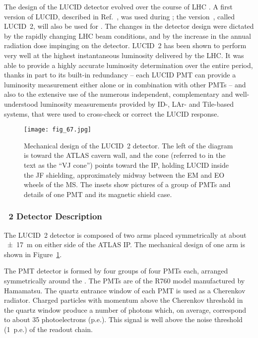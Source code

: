 \documentclass[cernpreprint, atlasdraft=false, UKenglish,british,orcidlogo, texmf, orcidlogo]{atlasdoc}
\begin{document}
The design of the \gls{LUCID} detector evolved over the course of \gls{LHC} \RunOneTwo. A first version of \gls{LUCID}, described in Ref.~\cite{PERF-2007-01}, was used during \RunOne; the \RunTwo version~\cite{lucid2-pmt,lucid2}, called \gls{LUCID}~2, will also be used for \RunThr. The changes in the detector design were dictated by the rapidly changing \gls{LHC} beam conditions, and by the increase in the annual radiation dose impinging on the detector. \gls{LUCID}~2 has been shown to perform very well at the highest instantaneous luminosity delivered by the \gls{LHC}. It was able to provide a highly accurate luminosity determination over the entire \RunTwo period, thanks in part to its built-in redundancy -- each \gls{LUCID} \gls{PMT} can provide a luminosity measurement either alone or in combination with other \glspl{PMT} -- and also to the extensive use of the numerous independent, complementary and well-understood luminosity measurements provided by \gls{ID}-, \gls{LAr}- and \gls{Tile}-based systems, that were used to cross-check or correct the \gls{LUCID} response.
 
 
\begin{figure}[hbtp]
\texttt{[image: fig\_67.jpg]}
\caption{Mechanical design of the \gls{LUCID}~2 detector. The left of the diagram is toward the ATLAS cavern wall, and the cone (referred to in the text as the ``VJ cone'') points toward the \gls{IP}, holding \gls{LUCID} inside the JF shielding, approximately midway between the EM and EO wheels of the \gls{MS}.  The insets show pictures of a group of \glspl{PMT} and details of one \gls{PMT} and its magnetic shield case. }
\label{fig:lucid_detector}
\end{figure}
 
\subsubsection{~2 Detector Description}
The \gls{LUCID}~2 detector is composed of two arms placed symmetrically
at about \SI{\pm 17}{\m} on either side of the ATLAS \gls{IP}. The mechanical design of one arm is shown in Figure~\ref{fig:lucid_detector}.
 
The \gls{PMT} detector is formed by four groups of four \glspl{PMT} each, arranged symmetrically around the \beampipe. The \glspl{PMT} are of the R760 model manufactured by Hamamatsu. The quartz entrance window of each \gls{PMT} is used as a Cherenkov radiator. Charged particles with momentum above the Cherenkov threshold in the quartz window produce a number of photons which, on average, correspond to about 35 photoelectrons (p.e.). This signal is well above the noise threshold (1~p.e.) of the readout chain.
 
\end{document}
